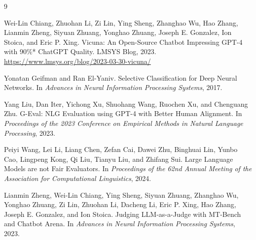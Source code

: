 \documentclass[11pt]{article}
\begin{document}
\begin{thebibliography}{9}

Wei-Lin Chiang, Zhuohan Li, Zi Lin, Ying Sheng, Zhanghao Wu, Hao Zhang, Lianmin Zheng, Siyuan Zhuang, Yonghao Zhuang, Joseph E. Gonzalez, Ion Stoica, and Eric P. Xing.
\newblock Vicuna: An Open-Source Chatbot Impressing GPT-4 with 90\%* ChatGPT Quality.
\newblock LMSYS Blog, 2023.
\newblock \url{https://www.lmsys.org/blog/2023-03-30-vicuna/}

Yonatan Geifman and Ran El-Yaniv.
\newblock Selective Classification for Deep Neural Networks.
\newblock In \emph{Advances in Neural Information Processing Systems}, 2017.

Yang Liu, Dan Iter, Yichong Xu, Shuohang Wang, Ruochen Xu, and Chenguang Zhu.
\newblock G-Eval: NLG Evaluation using GPT-4 with Better Human Alignment.
\newblock In \emph{Proceedings of the 2023 Conference on Empirical Methods in Natural Language Processing}, 2023.

Peiyi Wang, Lei Li, Liang Chen, Zefan Cai, Dawei Zhu, Binghuai Lin, Yunbo Cao, Lingpeng Kong, Qi Liu, Tianyu Liu, and Zhifang Sui.
\newblock Large Language Models are not Fair Evaluators.
\newblock In \emph{Proceedings of the 62nd Annual Meeting of the Association for Computational Linguistics}, 2024.

Lianmin Zheng, Wei-Lin Chiang, Ying Sheng, Siyuan Zhuang, Zhanghao Wu, Yonghao Zhuang, Zi Lin, Zhuohan Li, Dacheng Li, Eric P. Xing, Hao Zhang, Joseph E. Gonzalez, and Ion Stoica.
\newblock Judging LLM-as-a-Judge with MT-Bench and Chatbot Arena.
\newblock In \emph{Advances in Neural Information Processing Systems}, 2023.

\end{thebibliography}
\end{document}
